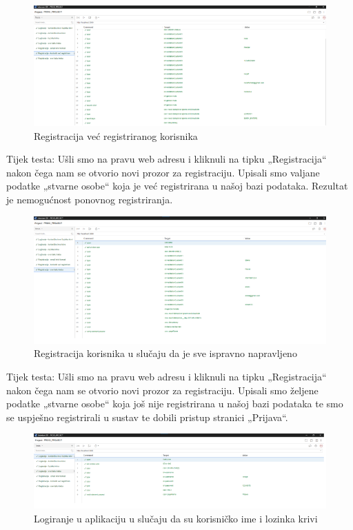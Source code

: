 			\begin{figure}[H]
				\includegraphics[scale=1]{slike/Ispit2.PNG} %
				\centering
				\caption{Registracija već registriranog korisnika}
				\label{fig:promjene}
			\end{figure}
			
			Tijek testa: Ušli smo na pravu web adresu i kliknuli na tipku „Registracija“ nakon čega nam se otvorio novi prozor za registraciju. Upisali smo valjane podatke „stvarne osobe“ koja je već registrirana u našoj bazi podataka. Rezultat je nemogućnost ponovnog registriranja.
			
			\begin{figure}[H]
				\includegraphics[scale=1]{slike/Ispit3.PNG} %
				\centering
				\caption{Registracija korisnika u slučaju da je sve ispravno napravljeno}
				\label{fig:promjene}
			\end{figure}
			
			Tijek testa: Ušli smo na pravu web adresu i kliknuli na tipku „Registracija“ nakon čega nam se otvorio novi prozor za registraciju. Upisali smo željene podatke „stvarne osobe“ koja još nije registrirana u našoj bazi podataka te smo se uspješno registrirali u sustav te dobili pristup stranici „Prijava“.
			
			\begin{figure}[H]
				\includegraphics[scale=1]{slike/Ispit4.PNG} %
				\centering
				\caption{Logiranje u aplikaciju u slučaju da su korisničko ime i lozinka krivi}
				\label{fig:promjene}
			\end{figure}
			

